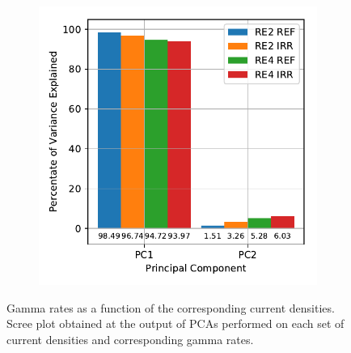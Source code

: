 \begin{figure}[H]
\begin{subfigure}{0.5\linewidth}
    		\includegraphics[width = \linewidth]{fig/chapt5/Scree_plot_J-vs-R.pdf}
        	\caption{\label{fig:GIFpp-J_R_correlation:B}}
    	\end{subfigure}
		\caption{\label{fig:GIFpp-J_R_correlation}  Gamma rates as a function of the corresponding current densities.  Scree plot obtained at the output of PCAs performed on each set of current densities and corresponding gamma rates.}
	\end{figure}

